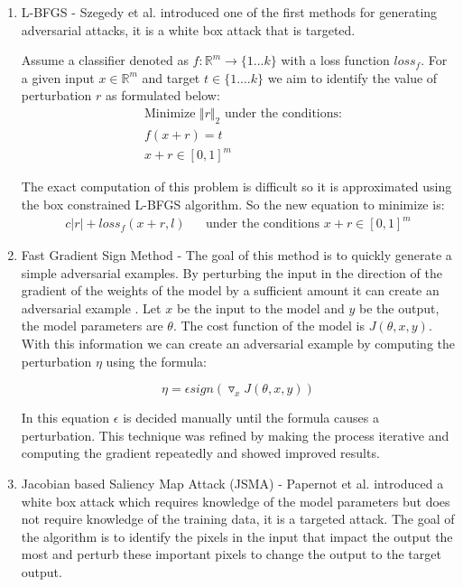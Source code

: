 \documentclass[journal,onecolumn]{IEEEtran}
\begin{document}
\begin{enumerate}
\item L-BFGS - Szegedy et al. \cite{szegedy_intriguing_2013} introduced one of the first methods for generating adversarial attacks, it is a white box attack that is targeted.

Assume a classifier denoted as $f : \mathbb{R}^m \rightarrow \{1...k\} $ with a loss function $loss_f$. For a given input $x \in \mathbb{R}^m$ and target $t \in \{1....k\}$ we aim to identify the value of perturbation $r$ as formulated below:
\begin{align*}
&  \text{Minimize  $\Vert r \Vert_2$ under the conditions:}\\
& f(x+r)= t \\
& x+r\in [0,1]^m
\end{align*}

The exact computation of this problem is difficult so it is approximated using the box constrained L-BFGS algorithm. So the new equation to minimize is:
\begin{align*}
c \vert r \vert + loss_f(x+r,l) && \text{under the conditions $x+r \in [0,1]^m$}
\end{align*}

\item Fast Gradient Sign Method - The goal of this method is to quickly generate a simple adversarial examples. By perturbing the input in the direction of the gradient of the weights of the model by a sufficient amount it can create an adversarial example \cite{goodfellow_explaining_2014}. Let $x$ be the input to the model and $y$ be the output, the model parameters are $\theta$. The cost function of the model is $J(\theta,x,y)$. With this information we can create an adversarial example by computing the perturbation $\eta$ using the formula:

\begin{equation}
\eta = \epsilon sign(\triangledown_x J(\theta,x,y))
\end{equation}

In this equation $\epsilon$ is decided manually until the formula causes a perturbation. This technique was refined by making the process iterative and computing the gradient repeatedly and showed improved results.

\item Jacobian based Saliency Map Attack (JSMA) - Papernot et al. \cite{papernot_limitations_2015} introduced a white box attack which requires knowledge of the model parameters but does not require knowledge of the training data, it is a targeted attack. The goal of the algorithm is to identify the pixels in the input that impact the output the most and perturb these important pixels to change the output to the target output. 


\end{enumerate}
\end{document}
